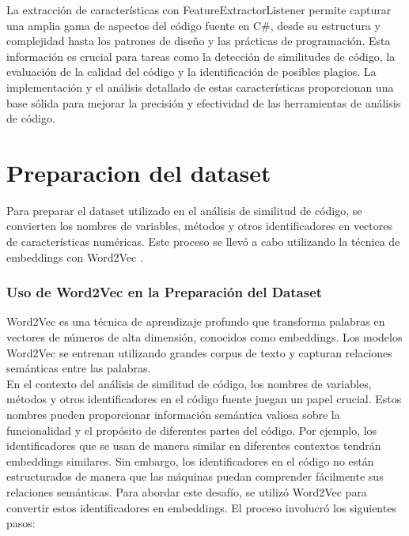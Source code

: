         
La extracción de características con FeatureExtractorListener permite capturar una amplia gama de aspectos del código fuente en C\#, desde su estructura y complejidad hasta los patrones de diseño y las prácticas de programación. Esta información es crucial para tareas como la detección de similitudes de código, la evaluación de la calidad del código y la identificación de posibles plagios. La implementación y el análisis detallado de estas características proporcionan una base sólida para mejorar la precisión y efectividad de las herramientas de análisis de código.

\section{Preparacion del dataset}

Para preparar el dataset utilizado en el análisis de similitud de código, se convierten los nombres de variables, métodos y otros identificadores en vectores de características numéricas. Este proceso se llevó a cabo utilizando la técnica de embeddings con Word2Vec \cite{mikolov2013efficient}. \\

\subsubsection{Uso de Word2Vec en la Preparación del Dataset}
Word2Vec es una técnica de aprendizaje profundo que transforma palabras en vectores de números de alta dimensión, conocidos como embeddings. Los modelos Word2Vec se entrenan utilizando grandes corpus de texto y capturan relaciones semánticas entre las palabras.  \\

En el contexto del análisis de similitud de código, los nombres de variables, métodos y otros identificadores en el código fuente juegan un papel crucial. Estos nombres pueden proporcionar información semántica valiosa sobre la funcionalidad y el propósito de diferentes partes del código. Por ejemplo, los identificadores que se usan de manera similar en diferentes contextos tendrán embeddings similares. Sin embargo, los identificadores en el código no están estructurados de manera que las máquinas puedan comprender fácilmente sus relaciones semánticas. Para abordar este desafío, se utilizó Word2Vec para convertir estos identificadores en embeddings. El proceso involucró los siguientes pasos:

